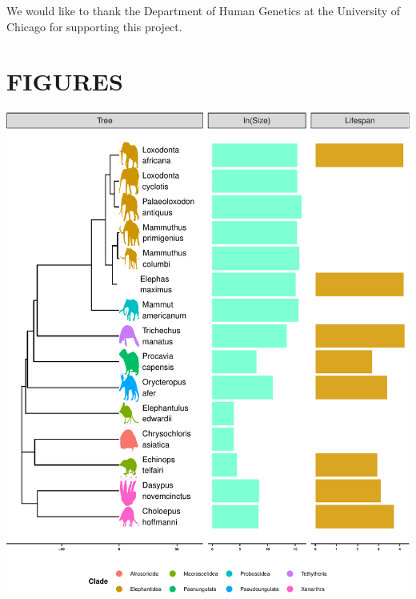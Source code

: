 \documentclass[]{elsarticle} %
\let\origfigure\figure
\let\endorigfigure\endfigure
\renewenvironment{figure}[1][2] {
    \expandafter\origfigure\expandafter[H]
} {
    \endorigfigure
}
\begin{document}
We would like to thank the Department of Human Genetics at the University of Chicago for supporting this project.

\hypertarget{figures}{%
\section{FIGURES}\label{figures}}



\begin{figure}[H]
\includegraphics[width=6in,]{paper_PLOS_draft_files/figure-latex/Figure-intro-1} \caption{\emph{Atlantogenatans} with sequenced genomes, body sizes, and known lifespans {[}14,21{]}}\label{fig:Figure-intro}
\end{figure}
\end{document}
